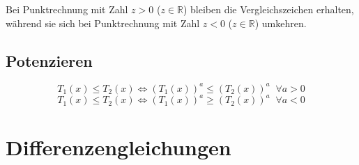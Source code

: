 \begin{satz}\label{satz:ungleichung}
Bei Punktrechnung mit Zahl $z > 0$ ($z\in\mathbb{R}$) bleiben die Vergleichszeichen erhalten, während sie sich bei Punktrechnung mit Zahl $z<0$ ($z\in\mathbb{R}$) umkehren.
\end{satz}

\subsection{Potenzieren}
\[T_{1}(x)\leq T_{2}(x)\Leftrightarrow \left(T_{1}(x)\right)^{a}\leq \left(T_{2}(x)\right)^{a}\;\;\forall a>0\]
\[T_{1}(x)\leq T_{2}(x)\Leftrightarrow \left(T_{1}(x)\right)^{a}\geq \left(T_{2}(x)\right)^{a}\;\;\forall a<0\]

\section{Differenzengleichungen}
